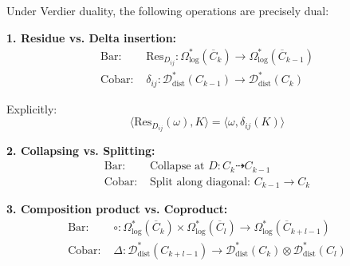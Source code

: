 \begin{theorem}\label{thm:dual-differentials}
Under Verdier duality, the following operations are precisely dual:

\textbf{1. Residue vs. Delta insertion:}
\begin{align*}
\text{Bar: } &\text{Res}_{D_{ij}}: \Omega^*_{\log}(\overline{C}_k) \to \Omega^*_{\log}(\overline{C}_{k-1})\\
\text{Cobar: } &\delta_{ij}: \mathcal{D}^*_{\text{dist}}(C_{k-1}) \to \mathcal{D}^*_{\text{dist}}(C_k)
\end{align*}

Explicitly:
$$\langle \text{Res}_{D_{ij}}(\omega), K \rangle = \langle \omega, \delta_{ij}(K) \rangle$$

\textbf{2. Collapsing vs. Splitting:}
\begin{align*}
\text{Bar: } &\text{Collapse at } D: C_k \dashrightarrow C_{k-1}\\
\text{Cobar: } &\text{Split along diagonal: } C_{k-1} \to C_k
\end{align*}

\textbf{3. Composition product vs. Coproduct:}
\begin{align*}
\text{Bar: } &\circ: \Omega^*_{\log}(\overline{C}_k) \times \Omega^*_{\log}(\overline{C}_l) \to \Omega^*_{\log}(\overline{C}_{k+l-1})\\
\text{Cobar: } &\Delta: \mathcal{D}^*_{\text{dist}}(C_{k+l-1}) \to \mathcal{D}^*_{\text{dist}}(C_k) \otimes \mathcal{D}^*_{\text{dist}}(C_l)
\end{align*}
\end{theorem}

